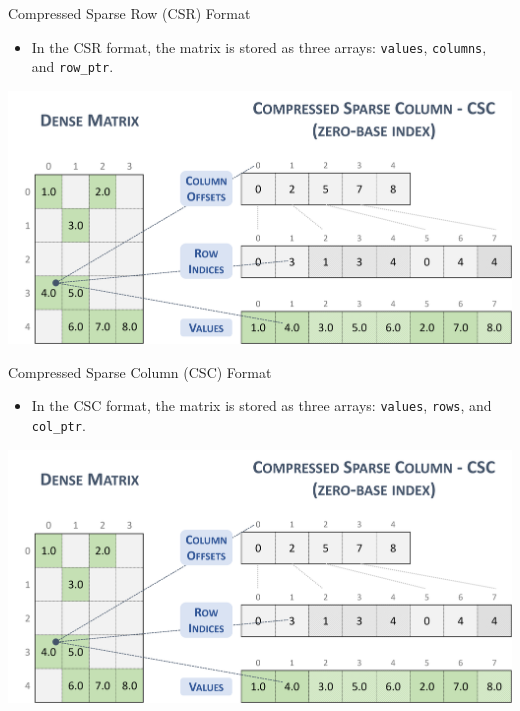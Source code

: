 \documentclass{beamer}
\begin{document}
\begin{frame}{Compressed Sparse Row (CSR) Format}
    \begin{itemize}
        \item In the CSR format, the matrix is stored as three arrays: \texttt{values}, \texttt{columns}, and \texttt{row\_ptr}.
     
    \end{itemize}
    \centerline{ \includegraphics[width=\textwidth]{csc.png}}
\end{frame}
\begin{frame}{Compressed Sparse Column (CSC) Format}
    \begin{itemize}
        \item In the CSC format, the matrix is stored as three arrays: \texttt{values}, \texttt{rows}, and \texttt{col\_ptr}.
       
    \end{itemize}
    \centerline{\includegraphics[width=\textwidth]{csc.png}}
\end{frame}
\end{document}
